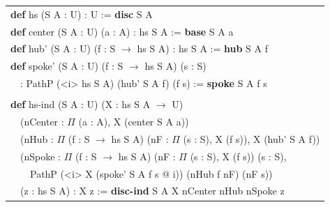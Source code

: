 \documentclass[a4paper,UKenglish,cleveref, autoref, thm-restate]{lipics-v2021}
\newcommand{\tabstyle}[0]{\scriptsize\ttfamily\fontseries{l}\selectfont}
\begin{document}
\begin{table}[ht!]
\tabstyle
\begin{tabular}{l}
\textbf{def} hs (S A : U) : U := \textbf{disc} S A \\
\textbf{def} center (S A : U) (a : A) : hs S A := \textbf{base} S A a \\
\textbf{def} hub' (S A : U) (f : S $\rightarrow$ hs S A) : hs S A := \textbf{hub} S A f \\
\textbf{def} spoke' (S A : U) (f : S $\rightarrow$ hs S A) (s : S) \\
\ \ : PathP (<i> hs S A) (hub' S A f) (f s) := \textbf{spoke} S A f s \\
\\
\textbf{def} hs-ind (S A : U) (X : hs S A $\rightarrow$ U) \\
\ \ (nCenter : $\Pi$ (a : A), X (center S A a)) \\
\ \ (nHub : $\Pi$ (f : S $\rightarrow$ hs S A) (nF : $\Pi$ (s : S), X (f s)), X (hub' S A f)) \\
\ \ (nSpoke : $\Pi$ (f : S $\rightarrow$ hs S A) (nF : $\Pi$ (s : S), X (f s)) (s : S), \\
\ \ \ \ PathP (<i> X (spoke' S A f s @ i)) (nHub f nF) (nF s)) \\
\ \ (z : hs S A) : X z := \textbf{disc-ind} S A X nCenter nHub nSpoke z
\end{tabular}
\end{table}




% 

% 
\end{document}
